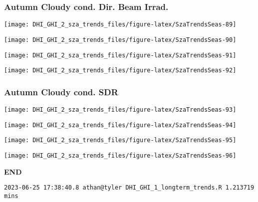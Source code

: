 \documentclass[
  10pt,
  a4paper,oneside]{article}
\begin{document}
\newpage

\hypertarget{autumn-cloudy-cond.-dir.-beam-irrad.}{%
\subsubsection{Autumn Cloudy cond. Dir. Beam Irrad.}\label{autumn-cloudy-cond.-dir.-beam-irrad.}}

\begin{center}\texttt{[image: DHI\_GHI\_2\_sza\_trends\_files/figure-latex/SzaTrendsSeas-89]} \end{center}

\begin{center}\texttt{[image: DHI\_GHI\_2\_sza\_trends\_files/figure-latex/SzaTrendsSeas-90]} \end{center}

\begin{center}\texttt{[image: DHI\_GHI\_2\_sza\_trends\_files/figure-latex/SzaTrendsSeas-91]} \end{center}

\begin{center}\texttt{[image: DHI\_GHI\_2\_sza\_trends\_files/figure-latex/SzaTrendsSeas-92]} \end{center}

\newpage

\hypertarget{autumn-cloudy-cond.-sdr}{%
\subsubsection{Autumn Cloudy cond. SDR}\label{autumn-cloudy-cond.-sdr}}

\begin{center}\texttt{[image: DHI\_GHI\_2\_sza\_trends\_files/figure-latex/SzaTrendsSeas-93]} \end{center}

\begin{center}\texttt{[image: DHI\_GHI\_2\_sza\_trends\_files/figure-latex/SzaTrendsSeas-94]} \end{center}

\begin{center}\texttt{[image: DHI\_GHI\_2\_sza\_trends\_files/figure-latex/SzaTrendsSeas-95]} \end{center}

\begin{center}\texttt{[image: DHI\_GHI\_2\_sza\_trends\_files/figure-latex/SzaTrendsSeas-96]} \end{center}

\textbf{END}

\begin{verbatim}
2023-06-25 17:38:40.8 athan@tyler DHI_GHI_1_longterm_trends.R 1.213719 mins
\end{verbatim}
\end{document}
